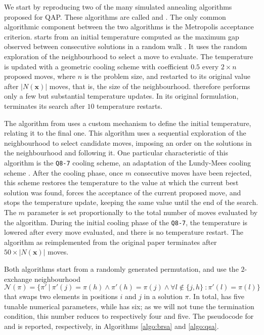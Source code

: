 We start by reproducing two of the many simulated annealing algorithms
proposed for QAP. These algorithms are called \brsa and \qsa
\cite{BurRen1984,COnnolly1990}. 
The only common algorithmic component between the two algorithms is the Metropolis
acceptance criterion. 
\brsa  starts from an initial temperature computed as the maximum gap observed between
consecutive solutions in a random walk \cite{BurRen1984}.
It uses the random exploration of the neighbourhood to select a move to evaluate.
The temperature is updated with a geometric cooling scheme with coefficient $0.5$
every $2 \times n$ proposed moves, where $n$ is the problem size, and restarted 
to its original value after $|N(\mathbf{x})|$ moves, that is, the size of the neighbourhood.
\brsa therefore performs only a few but substantial temperature updates.
In its original formulation, \brsa terminates its search after $10$ temperature
restarts.

The \qsa algorithm from \cite{COnnolly1990} 
uses a custom mechanism to define the initial temperature, relating it to
the final one.
This algorithm uses a sequential exploration of the neighbourhood to select candidate moves,
imposing an order on the solutions in the neighbourhood and following it.
One particular characteristic of this algorithm is the \texttt{Q8-7} cooling scheme,
an adaptation of the Lundy-Mees cooling scheme \cite{LundyMees1986}. After the cooling phase, once $m$
consecutive moves have been rejected, this scheme restores the temperature to the value at which
the current best solution was found, forces the acceptance of the current 
proposed move, and stops the temperature update, keeping the same value until the end of the search.
The $m$ parameter is set proportionally
to the total number of moves evaluated by the algorithm.
During the initial cooling phase of the \texttt{Q8-7}, the temperature is lowered 
after every move evaluated, and there is no temperature restart.
The algorithm as reimplemented from the original paper terminates after
$50 \times |N(\mathbf{x})|$ moves.

Both algorithms start from a randomly generated permutation, and use the
$2$-exchange neighbourhood
\begin{equation}
  \mathcal{N}(\pi) = \{\pi'\:|\: \pi'(j) = \pi(h) \wedge
  \pi'(h) = \pi(j) \wedge \forall l \notin \{j,h\}\: :\pi'(l)
  = \pi(l) \} 
\end{equation}
that swaps two elements in positions $i$ and $j$ in a solution $\pi$. In total, \brsa has five tunable numerical parameters, 
while \qsa has six; as we will not tune the termination condition, this number reduces 
to respectively four and five. The pseudocode for \brsa and \qsa is reported, respectively, in Algorithms 
\ref{algo:brsa} and \ref{algo:qsa}.


